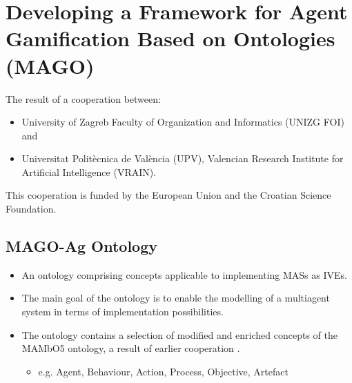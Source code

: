 \section[MAGO]{Developing a Framework for Agent Gamification Based on Ontologies (MAGO)}

\begin{frame}{\insertsection}
    The result of a cooperation between:
        \begin{itemize}
            \item University of Zagreb Faculty of Organization and Informatics (\alert{UNIZG FOI}) and
            \item Universitat Politècnica de València (\alert{UPV}), Valencian Research Institute for Artificial Intelligence (\alert{VRAIN}).
        \end{itemize}

    This cooperation is funded by the European Union and the Croatian Science Foundation.
\end{frame}

\begin{frame}{\insertsection}
\end{frame}



\subsection{MAGO-Ag Ontology}

\begin{frame}{\insertsubsection}
    \begin{itemize}
        \item An ontology comprising concepts applicable to \alert{implementing \acp{MAS} as \acp{IVE}}.

        \item The \alert{main goal} of the ontology is to enable the modelling of a multiagent system in terms of implementation possibilities.

        \item The ontology contains a selection of modified and enriched concepts of the MAMbO5 ontology, a result of earlier cooperation \cite{okresaduric2019MAMbO5NewOntology}.

        \begin{itemize}
            \item e.g. Agent, Behaviour, Action, Process, Objective, Artefact
        \end{itemize}
    \end{itemize}
\end{frame}

